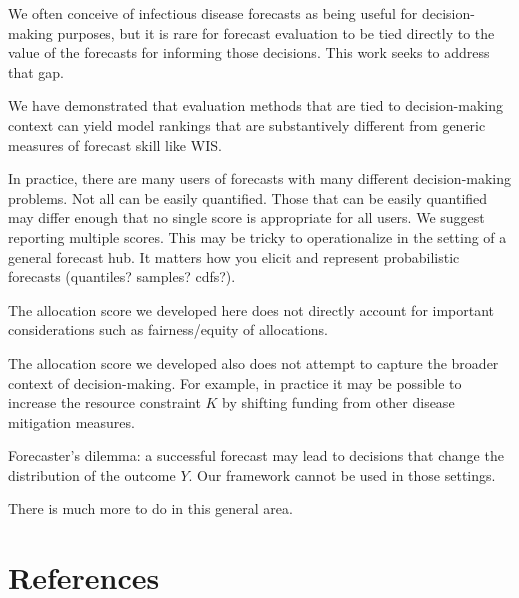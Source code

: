 \documentclass{article}
\begin{document}
We often conceive of infectious disease forecasts as being useful for decision-making purposes, but it is rare for forecast evaluation to be tied directly to the value of the forecasts for informing those decisions. This work seeks to address that gap.

We have demonstrated that evaluation methods that are tied to decision-making context can yield model rankings that are substantively different from generic measures of forecast skill like WIS.

In practice, there are many users of forecasts with many different decision-making problems. Not all can be easily quantified. Those that can be easily quantified may differ enough that no single score is appropriate for all users. We suggest reporting multiple scores. This may be tricky to operationalize in the setting of a general forecast hub. It matters how you elicit and represent probabilistic forecasts (quantiles? samples? cdfs?).

The allocation score we developed here does not directly account for important considerations such as fairness/equity of allocations.

The allocation score we developed also does not attempt to capture the broader context of decision-making. For example, in practice it may be possible to increase the resource constraint $K$ by shifting funding from other disease mitigation measures.

Forecaster's dilemma: a successful forecast may lead to decisions that change the distribution of the outcome $Y$. Our framework cannot be used in those settings.

There is much more to do in this general area.

\section{References}


\end{document}
